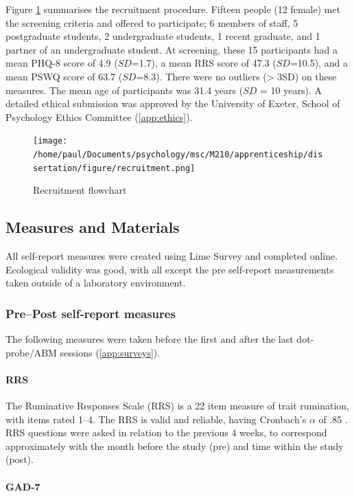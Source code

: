\documentclass[man,floatsintext,a4paper,biblatex]{apa6}\usepackage[]{graphicx}\usepackage[]{color}
\newcounter{Figure}
\begin{document}
Figure \ref{flowchart} summarises the recruitment procedure. Fifteen
people (12 female) met the screening criteria and offered
to participate; 6 members of staff, 5 postgraduate students,
2 undergraduate students, 1 recent graduate, and 1 partner of an
undergraduate student. At screening, these 15 participants had a mean
PHQ-8 score of 4.9
(${SD}$=1.7), a mean
RRS score of 47.3
(${SD}$=10.5), and a
mean PSWQ score of 63.7
(${SD}$=8.3). There were no
outliers (> 3SD) on these measures. The mean age of participants was 31.4
years (${SD}$ = 10 years). A detailed ethical submission was approved
by the University of Exeter, School of Psychology Ethics Committee
(\cref{app:ethics}).

\begin{figure}[!h]
  \centering
  \texttt{[image: /home/paul/Documents/psychology/msc/M210/apprenticeship/dissertation/figure/recruitment.png]}
  \caption{Recruitment flowchart}
  \label{flowchart}
\end{figure}

\subsection{Measures and Materials}

All self-report measures were created using Lime Survey
\parencite{limesurvey} and completed online. Ecological validity was
good, with all except the pre self-report measurements taken outside of
a laboratory environment.

\subsubsection{Pre--Post self-report measures}

The following measures were taken before the first and after the last
dot-probe/ABM sessions (\cref{app:surveys}).

\paragraph{RRS}

The Ruminative Responses Scale (RRS) is a 22 item measure
of trait rumination, with items rated 1--4. The
RRS is valid and reliable, having Cronbach's $\alpha$ of .85
\parencite{treynor_rumination_2003}. RRS questions were asked in
relation to the previous 4 weeks, to correspond approximately with the
month before the study (pre) and time within the study (post).

\paragraph{GAD-7}
\end{document}
